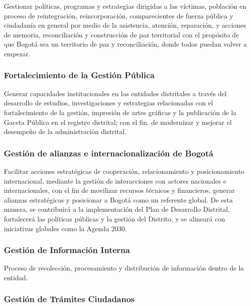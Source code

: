 \documentclass[
	a4paper, %
	12pt, %
]{include/CSSullivanBusinessReport}
\begin{document}
Gestionar políticas, programas y estrategias dirigidas a las víctimas,
población en proceso de reintegración, reincorporación, comparecientes
de fuerza pública y ciudadanía en general por medio de la asistencia,
atención, reparación, y acciones de memoria, reconciliación y
construcción de paz territorial con el propósito de que Bogotá sea un
territorio de paz y reconciliación, donde todos puedan volver a empezar.

\subsubsection{Fortalecimiento de la Gestión
Pública}\label{sec:fortalecimiento-de-la-gestiuxf3n-puxfablica}

Generar capacidades institucionales en las entidades distritales a
través del desarrollo de estudios, investigaciones y estrategias
relacionadas con el fortalecimiento de la gestión, impresión de artes
gráficas y la publicación de la Gaceta Pública en el registro distrital;
con el fin, de modernizar y mejorar el desempeño de la administración
distrital.

\subsubsection{Gestión de alianzas e internacionalización de
Bogotá}\label{sec:gestiuxf3n-de-alianzas-e-internacionalizaciuxf3n-de-bogotuxe1}

Facilitar acciones estratégicas de cooperación, relacionamiento y
posicionamiento internacional, mediante la gestión de interacciones con
actores nacionales e internacionales, con el fin de movilizar recursos
técnicos y financieros, generar alianzas estratégicas y posicionar a
Bogotá como un referente global. De esta manera, se contribuirá a la
implementación del Plan de Desarrollo Distrital, fortalecerá las
políticas públicas y la gestión del Distrito, y se alineará con
iniciativas globales como la Agenda 2030.

\subsubsection{Gestión de Información
Interna}\label{sec:gestiuxf3n-de-informaciuxf3n-interna}

Proceso de recolección, procesamiento y distribución de información
dentro de la entidad.

\subsubsection{Gestión de Trámites
Ciudadanos}\label{sec:gestiuxf3n-de-truxe1mites-ciudadanos}
\end{document}

